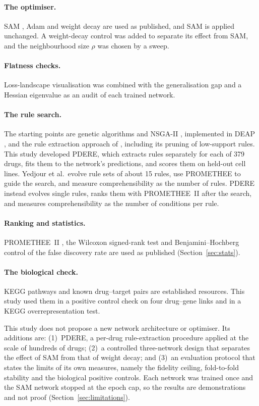 \paragraph{The optimiser.}
SAM \citep{foret2021}, Adam \citep{kingma2015} and weight decay \citep{goodfellow2016} are used as published, and SAM is applied unchanged. A weight-decay control was added to separate its effect from SAM, and the neighbourhood size $\rho$ was chosen by a sweep.

\paragraph{Flatness checks.}
Loss-landscape visualisation \citep{li2018} was combined with the generalisation gap and a Hessian eigenvalue as an audit of each trained network.

\paragraph{The rule search.}
The starting points are genetic algorithms and NSGA-II \citep{holland1975,deb2002}, implemented in DEAP \citep{fortin2012}, and the rule extraction approach of \citet{yedjour2024}, including its pruning of low-support rules. This study developed PDERE, which extracts rules separately for each of 379 drugs, fits them to the network's predictions, and scores them on held-out cell lines. Yedjour et al.\ evolve rule sets of about 15 rules, use PROMETHEE to guide the search, and measure comprehensibility as the number of rules. PDERE instead evolves single rules, ranks them with PROMETHEE~II after the search, and measures comprehensibility as the number of conditions per rule.

\paragraph{Ranking and statistics.}
PROMETHEE~II \citep{brans1985}, the Wilcoxon signed-rank test \citep{wilcoxon1945} and Benjamini--Hochberg control of the false discovery rate \citep{benjamini1995} are used as published (Section~\ref{sec:stats}).

\paragraph{The biological check.}
KEGG pathways and known drug--target pairs are established resources. This study used them in a positive control check on four drug--gene links and in a KEGG overrepresentation test.

\bigskip
\noindent This study does not propose a new network architecture or optimiser. Its additions are: (1)~PDERE, a per-drug rule-extraction procedure applied at the scale of hundreds of drugs; (2)~a controlled three-network design that separates the effect of SAM from that of weight decay; and (3)~an evaluation protocol that states the limits of its own measures, namely the fidelity ceiling, fold-to-fold stability and the biological positive controls. Each network was trained once and the SAM network stopped at the epoch cap, so the results are demonstrations and not proof (Section~\ref{sec:limitations}).